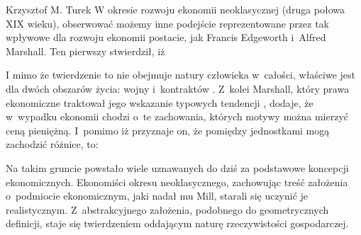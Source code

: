 \begin{artplenv}{Krzysztof M. Turek}
W okresie rozwoju ekonomii neoklasycznej (druga połowa XIX wieku), obserwować możemy inne podejście reprezentowane przez
tak wpływowe dla rozwoju ekonomii postacie, jak Francis Edgeworth i~Alfred Marshall. Ten pierwszy
\parencite[s.~16]{edgeworth_mathematical_1881}
stwierdził, iż 

I mimo że twierdzenie to nie obejmuje natury człowieka w~całości, właściwe jest dla dwóch obszarów życia:
wojny i~kontraktów
\parencite[s.~52]{edgeworth_mathematical_1881}.
Z~kolei Marshall, który prawa ekonomiczne traktował jego
wskazanie typowych tendencji
\parencite[s.~94-95]{marshall_zasady_1925},
dodaje, że w~wypadku ekonomii
chodzi o~te zachowania, których motywy można mierzyć ceną pieniężną. I~pomimo iż przyznaje on, że pomiędzy jednostkami mogą
zachodzić różnice, to:


Na takim gruncie powstało wiele uznawanych do dziś za podstawowe koncepcji ekonomicznych. Ekonomiści okresu
neoklasycznego, zachowując treść założenia o~podmiocie ekonomicznym, jaki nadał mu Mill, starali się uczynić je
realistycznym. Z~abstrakcyjnego założenia, podobnego do geometrycznych definicji, staje się twierdzeniem oddającym
naturę rzeczywistości gospodarczej. 


\end{artplenv}
